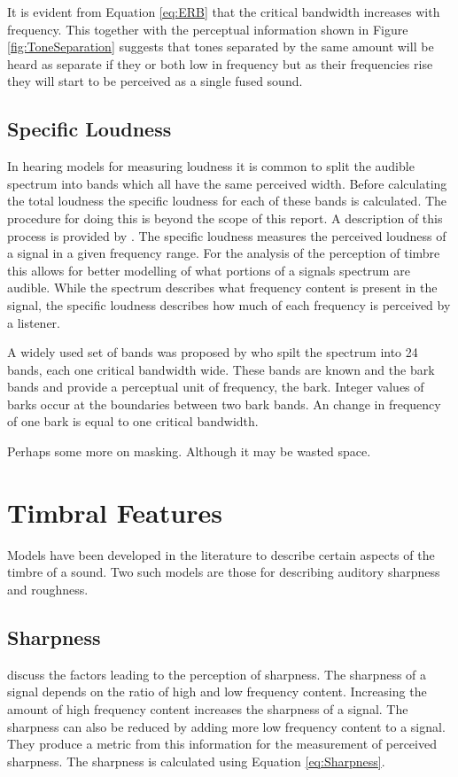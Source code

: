		It is evident from Equation \ref{eq:ERB} that the critical bandwidth increases with frequency. This together
		with the perceptual information shown in Figure \ref{fig:ToneSeparation} suggests that tones separated by
		the same amount will be heard as separate if they or both low in frequency but as their frequencies rise
		they will start to be perceived as a single fused sound.

	\subsection{Specific Loudness}
	\label{sec:Timbre-PsychoacousticPrinciples-SpecificLoudness}
		In hearing models for measuring loudness it is common to split the audible spectrum into bands which all
		have the same perceived width. Before calculating the total loudness the specific loudness for each of these
		bands is calculated. The procedure for doing this is beyond the scope of this report. A description of this
		process is provided by \citet{moore1997a}. The specific loudness measures the perceived loudness of a signal
		in a given frequency range. For the analysis of the perception of timbre this allows for better modelling of
		what portions of a signals spectrum are audible. While the spectrum describes what frequency content is
		present in the signal, the specific loudness describes how much of each frequency is perceived by a
		listener.

		A widely used set of bands was proposed by \citet{zwicker1961subdivision} who spilt the spectrum into 24
		bands, each one critical bandwidth wide. These bands are known and the bark bands and provide a perceptual
		unit of frequency, the bark. Integer values of barks occur at the boundaries between two bark bands. An
		change in frequency of one bark is equal to one critical bandwidth.

	\note
	{
		Perhaps some more on masking. Although it may be wasted space.
	}

\section{Timbral Features}
\label{sec:Timbre-TimbralFeatures}
	Models have been developed in the literature to describe certain aspects of the timbre of a sound. Two such models
	are those for describing auditory sharpness and roughness.
	
	\subsection{Sharpness}
		\citet{fastl2007psychoacoustics} discuss the factors leading to the perception of sharpness. The sharpness
		of a signal depends on the ratio of high and low frequency content. Increasing the amount of high frequency
		content increases the sharpness of a signal. The sharpness can also be reduced by adding more low frequency
		content to a signal. They produce a metric from this information for the measurement of perceived sharpness.
		The sharpness is calculated using Equation \ref{eq:Sharpness}.


